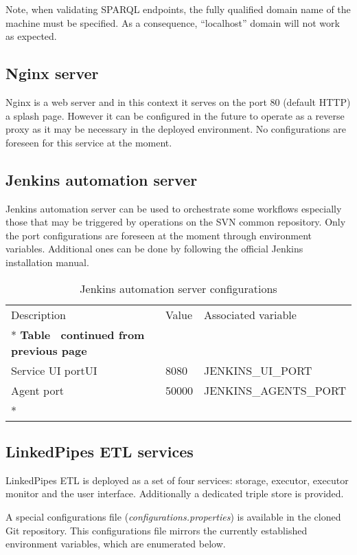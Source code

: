 	Note, when validating SPARQL endpoints, the fully qualified domain name of the machine must be specified. As a consequence, ``localhost'' domain will not work as expected.

	\subsection{Nginx server}
	
	Nginx is a web server and in this context it serves on the port 80 (default HTTP) a splash page. However it can be configured in the future to operate as a reverse proxy as it may be necessary in the deployed environment. No configurations are foreseen for this service at the moment. 
	
	\subsection{Jenkins automation server}
	
	Jenkins automation server can be used to orchestrate some workflows especially those that may be triggered by operations on the SVN common repository. Only the port configurations are foreseen at the moment through environment variables. Additional ones can be done by following the official Jenkins installation manual. 
	
	\begin{longtable}[c]{@{}p{4cm}p{5cm}l@{}}
		\toprule
		Description & Value & Associated variable \\* \midrule
		\endfirsthead
		\multicolumn{3}{c}%
		{{\bfseries Table \thetable\ continued from previous page}} \\
		\endhead
		Service UI portUI & 8080 & JENKINS\_UI\_PORT \\
		Agent port & 50000 & JENKINS\_AGENTS\_PORT \\* \bottomrule
		\caption{Jenkins automation server configurations}
		\label{tab:my-table4}\\
	\end{longtable}
	
	\subsection{LinkedPipes ETL services}
	
	LinkedPipes ETL is deployed as a set of four services: storage, executor, executor monitor and the user interface. Additionally a dedicated triple store is provided. 
	
	A special configurations file (\textit{configurations.properties}) is available in the cloned Git repository. This configurations file mirrors the currently established environment variables, which are enumerated below. 
	

